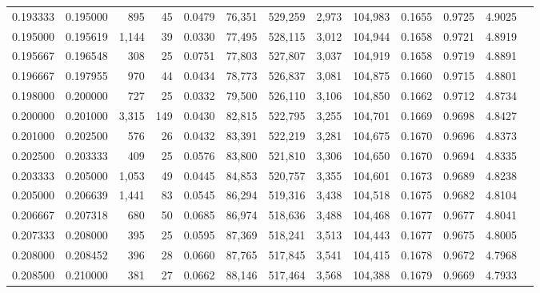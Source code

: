 \begin{tabular}{rrrrrrrrrrrrr}
0.193333 & 0.195000 &   895 &  45 &                                     0.0479 &  76,351 & 529,259 &   2,973 & 104,983 & 0.1655 & 0.9725 & 4.9025 \\
0.195000 & 0.195619 & 1,144 &  39 &                                     0.0330 &  77,495 & 528,115 &   3,012 & 104,944 & 0.1658 & 0.9721 & 4.8919 \\
0.195667 & 0.196548 &   308 &  25 &                                     0.0751 &  77,803 & 527,807 &   3,037 & 104,919 & 0.1658 & 0.9719 & 4.8891 \\
0.196667 & 0.197955 &   970 &  44 &                                     0.0434 &  78,773 & 526,837 &   3,081 & 104,875 & 0.1660 & 0.9715 & 4.8801 \\
0.198000 & 0.200000 &   727 &  25 &                                     0.0332 &  79,500 & 526,110 &   3,106 & 104,850 & 0.1662 & 0.9712 & 4.8734 \\
0.200000 & 0.201000 & 3,315 & 149 &                                     0.0430 &  82,815 & 522,795 &   3,255 & 104,701 & 0.1669 & 0.9698 & 4.8427 \\
0.201000 & 0.202500 &   576 &  26 &                                     0.0432 &  83,391 & 522,219 &   3,281 & 104,675 & 0.1670 & 0.9696 & 4.8373 \\
0.202500 & 0.203333 &   409 &  25 &                                     0.0576 &  83,800 & 521,810 &   3,306 & 104,650 & 0.1670 & 0.9694 & 4.8335 \\
0.203333 & 0.205000 & 1,053 &  49 &                                     0.0445 &  84,853 & 520,757 &   3,355 & 104,601 & 0.1673 & 0.9689 & 4.8238 \\
0.205000 & 0.206639 & 1,441 &  83 &                                     0.0545 &  86,294 & 519,316 &   3,438 & 104,518 & 0.1675 & 0.9682 & 4.8104 \\
0.206667 & 0.207318 &   680 &  50 &                                     0.0685 &  86,974 & 518,636 &   3,488 & 104,468 & 0.1677 & 0.9677 & 4.8041 \\
0.207333 & 0.208000 &   395 &  25 &                                     0.0595 &  87,369 & 518,241 &   3,513 & 104,443 & 0.1677 & 0.9675 & 4.8005 \\
0.208000 & 0.208452 &   396 &  28 &                                     0.0660 &  87,765 & 517,845 &   3,541 & 104,415 & 0.1678 & 0.9672 & 4.7968 \\
0.208500 & 0.210000 &   381 &  27 &                                     0.0662 &  88,146 & 517,464 &   3,568 & 104,388 & 0.1679 & 0.9669 & 4.7933 \\

\end{tabular}
